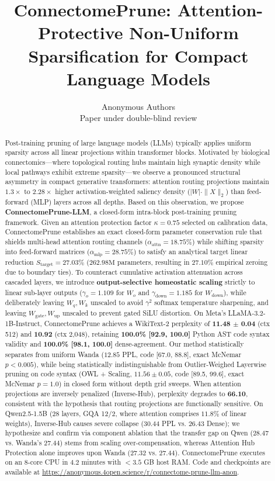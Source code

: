 \documentclass{article}
\title{ConnectomePrune: Attention-Protective Non-Uniform Sparsification for Compact Language Models}
\author{%
  Anonymous Authors \\
  Paper under double-blind review \\
}
\begin{document}
\maketitle

\begin{abstract}
Post-training pruning of large language models (LLMs) typically applies uniform sparsity across all linear projections within transformer blocks. Motivated by biological connectomics—where topological routing hubs maintain high synaptic density while local pathways exhibit extreme sparsity—we observe a pronounced structural asymmetry in compact generative transformers: attention routing projections maintain $1.3\times$ to $2.28\times$ higher activation-weighted saliency density ($|W| \cdot \|X\|_2$) than feed-forward (MLP) layers across all depths. Based on this observation, we propose \textbf{ConnectomePrune-LLM}, a closed-form intra-block post-training pruning framework. Given an attention protection factor $\kappa = 0.75$ selected on calibration data, ConnectomePrune establishes an exact closed-form parameter conservation rule that shields multi-head attention routing channels ($\alpha_{\text{attn}} = 18.75\%$) while shifting sparsity into feed-forward matrices ($\alpha_{\text{mlp}} = 28.75\%$) to satisfy an analytical target linear reduction $S_{\text{target}} = 27.03\%$ ($262.98\text{M}$ parameters, resulting in $27.10\%$ empirical zeroing due to boundary ties). To counteract cumulative activation attenuation across cascaded layers, we introduce \textbf{output-selective homeostatic scaling} strictly to linear sub-layer outputs ($\gamma_o = 1.109$ for $W_o$ and $\gamma_{\text{down}} = 1.185$ for $W_{\text{down}}$), while deliberately leaving $W_q, W_k$ unscaled to avoid $\gamma^2$ softmax temperature sharpening, and leaving $W_{\text{gate}}, W_{\text{up}}$ unscaled to prevent gated SiLU distortion. On Meta's LLaMA-3.2-1B-Instruct, ConnectomePrune achieves a WikiText-2 perplexity of \textbf{11.48 $\pm$ 0.04} (ctx 512) and \textbf{10.92} (ctx 2,048), retaining \textbf{100.0\% [92.9, 100.0]} Python AST code syntax validity and \textbf{100.0\% [98.1, 100.0]} dense-agreement. Our method statistically separates from uniform Wanda ($12.85$ PPL, code [67.0, 88.8], exact McNemar $p < 0.005$), while being statistically indistinguishable from Outlier-Weighed Layerwise pruning on code syntax (OWL + Scaling, $11.56 \pm 0.05$, code [89.5, 99.6], exact McNemar $p = 1.0$) in closed form without depth grid sweeps. When attention projections are inversely penalized (Inverse-Hub), perplexity degrades to \textbf{66.10}, consistent with the hypothesis that routing projections are functionally sensitive. On Qwen2.5-1.5B (28 layers, GQA 12/2, where attention comprises $11.8\%$ of linear weights), Inverse-Hub causes severe collapse ($30.44$ PPL vs. $26.43$ Dense); we hypothesize and confirm via component ablation that the transfer gap on Qwen ($28.47$ vs. Wanda's $27.44$) stems from scaling over-compensation, whereas Attention Hub Protection alone improves upon Wanda ($27.32$ vs. $27.44$). ConnectomePrune executes on an 8-core CPU in $4.2$ minutes with $< 3.5$ GB host RAM. Code and checkpoints are available at \url{https://anonymous.4open.science/r/connectome-prune-llm-anon}.
\end{abstract}
\end{document}
